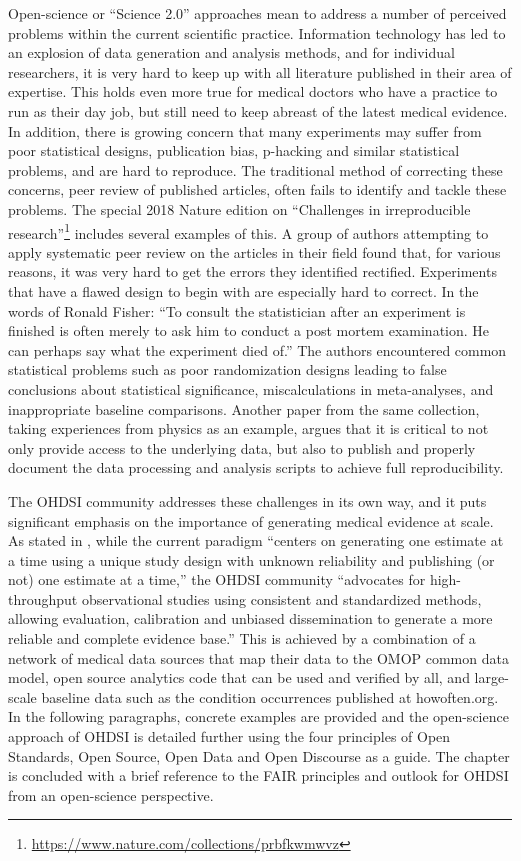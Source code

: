 \documentclass[11pt]{book}
\let\rmarkdownfootnote\footnote%
\def\footnote{\protect\rmarkdownfootnote}
\theoremstyle{definition}
\theoremstyle{definition}
\theoremstyle{definition}
\theoremstyle{remark}
\begin{document}
Open-science or ``Science 2.0'' \citep{wiki:Science_2.0} approaches mean to address a number of perceived problems within the current scientific practice. Information technology has led to an explosion of data generation and analysis methods, and for individual researchers, it is very hard to keep up with all literature published in their area of expertise. This holds even more true for medical doctors who have a practice to run as their day job, but still need to keep abreast of the latest medical evidence. In addition, there is growing concern that many experiments may suffer from poor statistical designs, publication bias, p-hacking and similar statistical problems, and are hard to reproduce. The traditional method of correcting these concerns, peer review of published articles, often fails to identify and tackle these problems. The special 2018 Nature edition on ``Challenges in irreproducible research''\footnote{\url{https://www.nature.com/collections/prbfkwmwvz}} includes several examples of this. A group of authors attempting to apply systematic peer review on the articles in their field found that, for various reasons, it was very hard to get the errors they identified rectified. Experiments that have a flawed design to begin with are especially hard to correct. In the words of Ronald Fisher: ``To consult the statistician after an experiment is finished is often merely to ask him to conduct a post mortem examination. He can perhaps say what the experiment died of.'' \citep{wikiquote:Ronald_Fisher} The authors encountered common statistical problems such as poor randomization designs leading to false conclusions about statistical significance, miscalculations in meta-analyses, and inappropriate baseline comparisons. \citep{allison_2016} Another paper from the same collection, taking experiences from physics as an example, argues that it is critical to not only provide access to the underlying data, but also to publish and properly document the data processing and analysis scripts to achieve full reproducibility. \citep{Chen2018}

The OHDSI community addresses these challenges in its own way, and it puts significant emphasis on the importance of generating medical evidence at scale. As stated in \citet{schuemie_2018b}, while the current paradigm ``centers on generating one estimate at a time using a unique study design with unknown reliability and publishing (or not) one estimate at a time,'' the OHDSI community ``advocates for high-throughput observational studies using consistent and standardized methods, allowing evaluation, calibration and unbiased dissemination to generate a more reliable and complete evidence base.'' This is achieved by a combination of a network of medical data sources that map their data to the OMOP common data model, open source analytics code that can be used and verified by all, and large-scale baseline data such as the condition occurrences published at howoften.org. In the following paragraphs, concrete examples are provided and the open-science approach of OHDSI is detailed further using the four principles of Open Standards, Open Source, Open Data and Open Discourse as a guide. The chapter is concluded with a brief reference to the FAIR principles and outlook for OHDSI from an open-science perspective.
\end{document}
